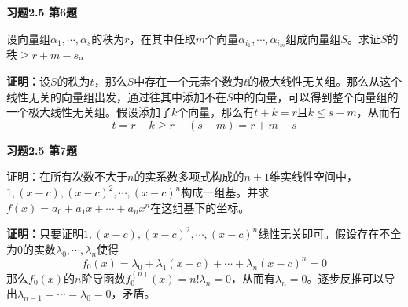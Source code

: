 \newpageorvspace

{\bf 习题2.5 第6题}

设向量组$\alpha_1,\cdots,\alpha_s$的秩为$r$，在其中任取$m$个向量$\alpha_{i_1},\cdots,\alpha_{i_m}$组成向量组$S$。求证$S$的秩$\geqslant r+m-s$。

{\bf 证明：}设$S$的秩为$t$，那么$S$中存在一个元素个数为$t$的极大线性无关组。那么从这个线性无关的向量组出发，通过往其中添加不在$S$中的向量，可以得到整个向量组的一个极大线性无关组。假设添加了$k$个向量，那么有$t+k=r$且$k\leqslant s-m$，从而有
$$t = r - k \geqslant r - (s-m) = r+m-s$$

\newpageorvspace

{\bf 习题2.5 第7题}

证明：在所有次数不大于$n$的实系数多项式构成的$n+1$维实线性空间中，$1, (x-c), (x-c)^2, \cdots, (x-c)^n$构成一组基。并求$f(x) = a_0 + a_1x + \cdots + a_nx^n$在这组基下的坐标。

{\bf 证明：}只要证明$1, (x-c), (x-c)^2, \cdots, (x-c)^n$线性无关即可。假设存在不全为0的实数$\lambda_0,\cdots,\lambda_n$使得
$$f_0(x) = \lambda_0 + \lambda_1(x-c) + \cdots + \lambda_n(x-c)^n = 0$$
那么$f_0(x)$的$n$阶导函数$f_0^{(n)}(x) = n!\lambda_n = 0$，从而有$\lambda_n = 0$。逐步反推可以导出$\lambda_{n-1} = \cdots = \lambda_0 = 0$，矛盾。

